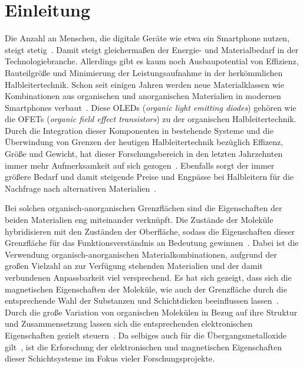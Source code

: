 \chapter{Einleitung}
    Die Anzahl an Menschen, die digitale Geräte wie etwa ein Smartphone nutzen, steigt stetig~\cite{Statista}.
    Damit steigt gleichermaßen der Energie- und Materialbedarf in der Technologiebranche.
    Allerdings gibt es kaum noch Ausbaupotential von Effizienz, Bauteilgröße und Minimierung der Leistungsaufnahme in der herkömmlichen Halbleitertechnik.
    Schon seit einigen Jahren werden neue Materialklassen wie Kombinationen aus organischen und anorganischen Materialien in modernen Smartphones verbaut~\cite{MAC}.
    Diese OLEDs (\textit{organic light emitting diodes}) gehören wie die OFETs (\textit{organic field effect transistors}) zu der organischen Halbleitertechnik.
    Durch die Integration dieser Komponenten in bestehende Systeme und die Überwindung von Grenzen der heutigen Halbleitertechnik bezüglich Effizenz, Größe und Gewicht, hat dieser Forschungsbereich in den letzten Jahrzehnten immer mehr Aufmerksamkeit auf sich gezogen~\cite{Uni-Tübingen}.
    Ebenfalls sorgt der immer größere Bedarf und damit steigende Preise und Engpässe bei Halbleitern für die Nachfrage nach alternativen Materialien~\cite{Idealo}.

    Bei solchen organisch-anorganischen Grenzflächen sind die Eigenschaften der beiden Materialien eng miteinander verknüpft.
    Die Zustände der Moleküle hybridisieren mit den Zuständen der Oberfläche, sodass die Eigenschaften dieser Grenzfläche für das Funktionsverständnis an Bedeutung gewinnen~\cite{5A_12, kroemer_nobel_2001}.
    Dabei ist die Verwendung organisch-anorganischen Materialkombinationen, aufgrund der großen Vielzahl an zur Verfügung stehenden Materialien und der damit verbundenen Anpassbarkeit viel versprechend.
    Es hat sich gezeigt, dass sich die magnetischen Eigenschaften der Moleküle, wie auch der Grenzfläche durch die entsprechende Wahl der Substanzen und Schichtdicken beeinflussen lassen~\cite{IF_16}.
    Durch die große Variation von organischen Molekülen in Bezug auf ihre Struktur und Zusammensetzung lassen sich die entsprechenden elektronischen Eigenschaften gezielt steuern~\cite{scholl_chapter_2018}.
    Da selbiges auch für die Übergangsmetalloxide gilt~\cite{5A_4}, ist die Erforschung der elektronischen und magnetischen Eigenschaften dieser Schichtsysteme im Fokus vieler Forschungsprojekte.


